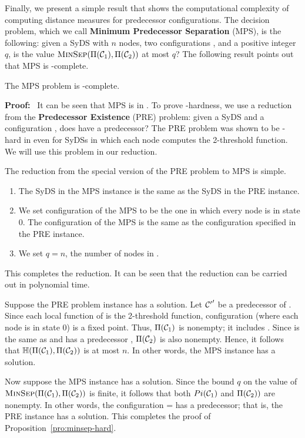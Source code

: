 \newcommand{\mps}{\mbox{MPS}}
\newcommand{\pre}{\mbox{PRE}}

\smallskip

Finally, we present a simple result that shows the computational complexity
of computing distance measures for predecessor configurations.
The decision problem, which we call \textbf{Minimum Predecessor Separation} (\mps),
is the following: given a SyDS \cals{} with $n$ nodes, two configurations \calcone,{}
\calctwo{} and a positive integer $q$, is the value 
$\mbox{\textsc{MinSep}}(\Pi(\mbox{$\mathcal{C}_{1}$}), \Pi(\mbox{$\mathcal{C}_{2}$}))$ at most $q$?
The following result points out that \mps{} is \cnp-complete.

\begin{proposition}\label{pro:minsep-hard}
The \mps{} problem is \cnp-complete.
\end{proposition}

\noindent
\textbf{Proof:}~ It can be seen that \mps{} is in \cnp.
To prove \cnp-hardness,
we use a reduction from the 
\textbf{Predecessor Existence} (\pre) problem: given a SyDS \cals{} and
a configuration \calc, does \calc{} have a predecessor?
The \pre{} problem was shown to be \cnp-hard in \cite{BH+07}
even for SyDSs in which each node computes the 2-threshold function.
We will use this problem in our reduction.

\smallskip

\noindent
The reduction from the special version of the \pre{} problem to \mps{}
is simple.
\begin{enumerate}
\item The SyDS \cals{} in the \mps{} instance is the same as the SyDS in the
\pre{} instance.
\item We set configuration \calcone{} of the \mps{} to be the one in which
every node is in state 0.
The configuration \calctwo{} of the \mps{} is the same as the configuration
\calc{} specified in the \pre{} instance.
\item We set $q = n$, the number of nodes in \cals.
\end{enumerate}
This completes the reduction. It can be seen that the reduction
can be carried out in polynomial time.

Suppose the \pre{} problem instance has a solution.
Let $\mbox{$\mathcal{C'}$}'$ be a predecessor of \calc.
Since each local function of \cals{} is the 2-threshold function,
configuration \calcone{} (where each node is in state 0) is a fixed point.
Thus, $\Pi(\mbox{$\mathcal{C}_{1}$})$ is nonempty; it includes \calcone.
Since \calctwo{} is the same as \calc{} and \calc{} has a
predecessor \calcp,  $\Pi(\mbox{$\mathcal{C}_{2}$})$ is also nonempty. 
Hence, it follows that $\mbox{$\mathbb{H}$}(\Pi(\mbox{$\mathcal{C}_{1}$}), \Pi(\mbox{$\mathcal{C}_{2}$}))$ is at most $n$.
In other words, the \mps{} instance has a solution.

Now suppose the \mps{} instance has a solution.
Since the bound $q$ on the value of 
$\mbox{\textsc{MinSep}}(\Pi(\mbox{$\mathcal{C}_{1}$}), \Pi(\mbox{$\mathcal{C}_{2}$}))$ is finite, 
it follows that both 
$Pi(\mbox{$\mathcal{C}_{1}$})$ and $\Pi(\mbox{$\mathcal{C}_{2}$}))$ are nonempty. 
In other words, the configuration \calctwo{} = \calc{}
has a predecessor; that is, the \pre{} instance has a solution.
This completes the proof of Proposition~\ref{pro:minsep-hard}. \QED

